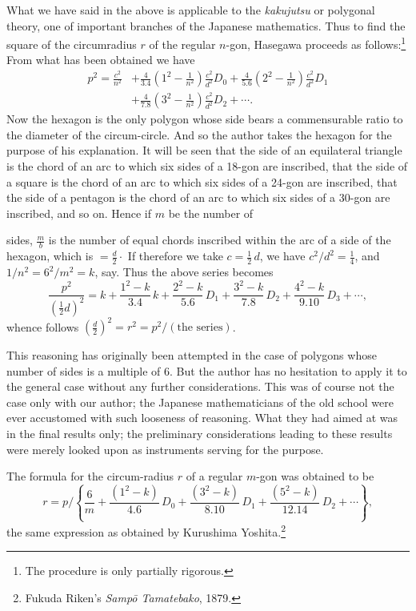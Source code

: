 \documentclass[11pt]{article}
\newcommand{\scanpage}[2]{\clearpage\setcounter{footnote}{0}\noindent{\footnotesize\color{gray}PDF page #1 · #2}\par\medskip}
\begin{document}
What we have said in the above is applicable to the \emph{kakujutsu} or polygonal theory, one of important branches of the Japanese mathematics. Thus to find the square of the circumradius $r$ of the regular $n$-gon, Hasegawa proceeds as follows:\footnote{The procedure is only partially rigorous.} From what has been obtained we have
\[
\begin{aligned}
p^2=\frac{c^2}{n^2}&+\frac{4}{3.4}\left(1^2-\frac{1}{n^2}\right)\frac{c^2}{d^2}D_0+\frac{4}{5.6}\left(2^2-\frac{1}{n^2}\right)\frac{c^2}{d^2}D_1\\
&+\frac{4}{7.8}\left(3^2-\frac{1}{n^2}\right)\frac{c^2}{d^2}D_2+\cdots.
\end{aligned}
\]
Now the hexagon is the only polygon whose side bears a commensurable ratio to the diameter of the circum-circle. And so the author takes the hexagon for the purpose of his explanation. It will be seen that the side of an equilateral triangle is the chord of an arc to which six sides of a 18-gon are inscribed, that the side of a square is the chord of an arc to which six sides of a 24-gon are inscribed, that the side of a pentagon is the chord of an arc to which six sides of a 30-gon are inscribed, and so on. Hence if $m$ be the number of

\scanpage{0298}{printed page 284}
sides, $\frac{m}{b}$ is the number of equal chords inscribed within the arc of a side of the hexagon, which is $=\frac{d}{2}\cdot$ If therefore we take $c=\frac{1}{2}\,d$, we have $c^2/d^2=\frac{1}{4}$, and $1/n^2=6^2/m^2=k$, say. Thus the above series becomes
\[
\frac{p^2}{(\frac{1}{2}d)^2}=k+\frac{1^2-k}{3.4}\,k+\frac{2^2-k}{5.6}\,D_1+\frac{3^2-k}{7.8}\,D_2+\frac{4^2-k}{9.10}\,D_3+\cdots,
\]
whence follows $\left(\frac{d}{2}\right)^2=r^2=p^2/(\text{the series})$.

This reasoning has originally been attempted in the case of polygons whose number of sides is a multiple of 6. But the author has no hesitation to apply it to the general case without any further considerations. This was of course not the case only with our author; the Japanese mathematicians of the old school were ever accustomed with such looseness of reasoning. What they had aimed at was in the final results only; the preliminary considerations leading to these results were merely looked upon as instruments serving for the purpose.

The formula for the circum-radius $r$ of a regular $m$-gon was obtained to be
\[
r=p/\left\{\frac{6}{m}+\frac{(1^2-k)}{4.6}\,D_0+\frac{(3^2-k)}{8.10}\,D_1+\frac{(5^2-k)}{12.14}\,D_2+\cdots\right\},
\]
the same expression as obtained by Kurushima Yoshita.\footnote{Fukuda Riken's \emph{Sampō Tamatebako}, 1879.}
\end{document}

